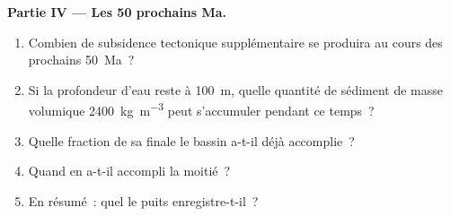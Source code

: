 \begin{problem}
\noindent\textbf{Partie IV --- Les 50 prochains Ma.}
\begin{enumerate}[resume]
  \item Combien de subsidence tectonique supplémentaire se produira au cours des prochains \qty{50}{Ma}~?
  \item Si la profondeur d'eau reste à \qty{100}{m}, quelle quantité de sédiment de masse volumique
        \qty{2400}{kg.m^{-3}} peut s'accumuler pendant ce temps~?
  \item Quelle fraction de sa  finale le bassin a-t-il déjà accomplie~?
  \item Quand en a-t-il accompli la moitié~?
  \item En résumé~: quel  le puits enregistre-t-il~?
\end{enumerate}
\end{problem}
